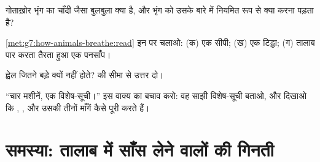 \begin{exercise}[$\star\star$]\label{exo:g7:how-animals-breathe:9}
गोताख़ोर भृंग का चाँदी जैसा बुलबुला क्या है, और भृंग को उसके बारे में
नियमित रूप से क्या करना पड़ता है?
\end{exercise}

\begin{exercise}[$\star\star$]\label{exo:g7:how-animals-breathe:10}
\cref{met:g7:how-animals-breathe:read} इन पर चलाओ: (क) एक सीपी; (ख) एक
टिड्डा; (ग) तालाब पार करता तैरता हुआ एक पनसाँप।
\end{exercise}

\begin{exercise}[$\star\star$]\label{exo:g7:how-animals-breathe:11}
ह्वेल जितने बड़े  क्यों नहीं होते?  की सीमा से उत्तर दो।
\end{exercise}

\begin{exercise}[$\star\star\star$]\label{exo:g7:how-animals-breathe:12}
``चार मशीनें, एक विशेष-सूची।'' इस वाक्य का बचाव करो: वह साझी विशेष-सूची
बताओ, और दिखाओ कि , ,  और  उसकी तीनों
माँगें कैसे पूरी करते हैं।
\end{exercise}

\section{समस्या: तालाब में साँस लेने वालों की गिनती}

